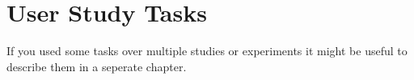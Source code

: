 
\chapter{User Study Tasks}
\label{sec:tasks}
If you used some tasks over multiple studies or experiments it might be useful to describe them in a seperate chapter.